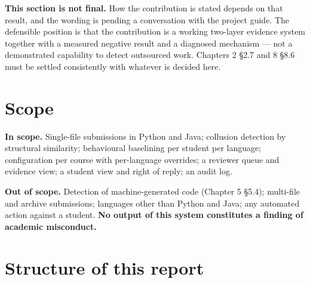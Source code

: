 \begin{draftnote}

\textbf{This section is not final.} How the contribution is stated
depends on that result, and the wording is pending a conversation with
the project guide. The defensible position is that the contribution is a
working two-layer evidence system together with a measured negative
result and a diagnosed mechanism --- not a demonstrated capability to
detect outsourced work. Chapters 2 \S{}2.7 and 8 \S{}8.6 must be settled
consistently with whatever is decided here.

\end{draftnote}

\hypertarget{scope}{%
\section{Scope}\label{scope}}

\textbf{In scope.} Single-file submissions in Python and Java; collusion
detection by structural similarity; behavioural baselining per student
per language; configuration per course with per-language overrides; a
reviewer queue and evidence view; a student view and right of reply; an
audit log.

\textbf{Out of scope.} Detection of machine-generated code (Chapter 5
\S{}5.4); multi-file and archive submissions; languages other than Python
and Java; any automated action against a student. \textbf{No output of
this system constitutes a finding of academic misconduct.}

\hypertarget{structure-of-this-report}{%
\section{Structure of this report}\label{structure-of-this-report}}

